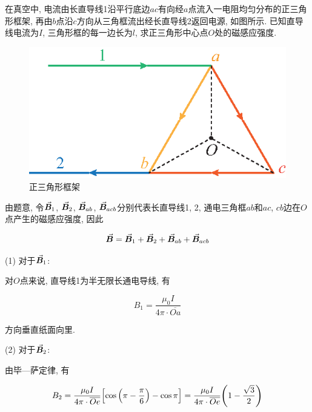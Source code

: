 \begin{example}
	在真空中, 电流由长直导线1沿平行底边$ac$有向经$a$点流入一电阻均匀分布的正三角形框架, 再由$b$点沿$c$方向从三角框流出经长直导线2返回电源, 如图所示. 已知直导线电流为$I$, 三角形框的每一边长为$l$, 求正三角形中心点$O$处的磁感应强度. 
	
	\begin{figure}[H]
		\centering
		\includegraphics[scale=0.9]{C8-fig6.eps}
		\caption{正三角形框架}
		\label{C8-fig6}
	\end{figure}
	
	\begin{solution}
		
		由题意, 令$\va*{B}_1$, $\va*{B}_2$, $\va*{B}_{ab}$, $\va*{B}_{acb}$分别代表长直导线1, 2, 通电三角框$ab$和$ac$, $cb$边在$O$点产生的磁感应强度, 因此
		
		\begin{equation*}
			\va*{B} = \va*{B}_1 + \va*{B}_2 + \va*{B}_{ab} + \va*{B}_{acb}
		\end{equation*}
		
		(1) 对于$\va*{B}_1$: 
		
		对$O$点来说, 直导线1为半无限长通电导线, 有
		
		\begin{equation*}
			B_1 = \dfrac{\mu_0 I}{4 \pi \cdot \overline{Oa}}
		\end{equation*}
		
		方向垂直纸面向里. 
		
		(2) 对于$\va*{B}_2$: 
		
		由毕—萨定律, 有
		
		\begin{equation*}
			B_2 = \dfrac{\mu_0 I}{4 \pi \cdot \overline{Oe}} \qty[\cos \qty(\pi - \dfrac{\pi}{6}) - \cos \pi] = \dfrac{\mu_0 I}{4 \pi \cdot \overline{Oe}} \qty(1 - \dfrac{\sqrt{3}}{2})
		\end{equation*}
		

\end{solution}
\end{example}
